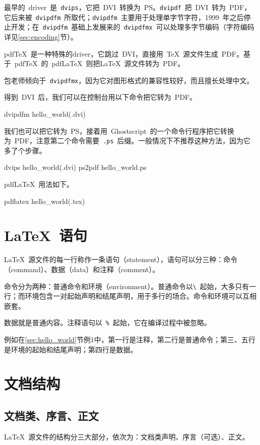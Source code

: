 最早的~driver~是~\verb|dvips|，它把~DVI~转换为~PS。\verb|dvipdf|~把~DVI~转为~PDF，它后来被~\verb|dvipdfm|~所取代；\verb|dvipdfm|~主要用于处理单字节字符，1999~年之后停止开发；在~\verb|dvipdfm|~基础上发展来的~\verb|dvipdfmx|~可以处理多字节编码（字符编码详见\ref{sec:encoding}节）。

pdf\TeX~是一种特殊的driver，它跳过~DVI，直接用~\TeX~源文件生成~PDF。基于~pdf\TeX~的~pdf\LaTeX~则把\LaTeX~源文件转为~PDF。

包老师倾向于~\verb|dvipdfmx|，因为它对图形格式的兼容性较好，而且擅长处理中文。

得到~DVI~后，我们可以在控制台用以下命令把它转为~PDF。
\begin{code}
dvipdfm hello_world(.dvi)
\end{code}

我们也可以把它转为~PS，接着用~Ghostscript~的一个命令行程序把它转换为~PDF，注意第二个命令需要~\verb|.ps|~后缀。一般情况下不推荐这种方法，因为它多了个步骤。
\begin{code}
dvips hello_world(.dvi)
ps2pdf hello_world.ps
\end{code}

pdf\LaTeX~用法如下。
\begin{code}
pdflatex hello_world(.tex)
\end{code}

\section{\LaTeX~语句}
\LaTeX~源文件的每一行称作一条语句（statement），语句可以分三种：命令（command）、数据（data）和注释（comment）。

命令分为两种：普通命令和环境（environment）。普通命令以\verb|\|~起始，大多只有一行；而环境包含一对起始声明和结尾声明，用于多行的场合。命令和环境可以互相嵌套。

数据就是普通内容。注释语句以~\verb|%|~起始，它在编译过程中被忽略。

例如在\ref{sec:hello_world}节例1中，第一行是注释，第二行是普通命令；第三、五行是环境的起始和结尾声明；第四行是数据。

\section{文档结构}
\subsection{文档类、序言、正文}
\LaTeX~源文件的结构分三大部分，依次为：文档类声明、序言（可选）、正文。

